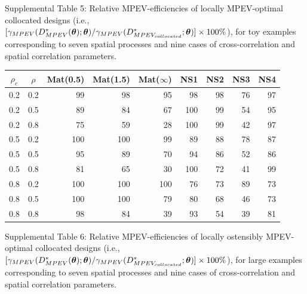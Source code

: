 \documentclass[12pt]{article}
\def\btheta{\mbox{\boldmath$\theta$}}
\begin{document}
Supplemental Table 5:  Relative MPEV-efficiencies of locally MPEV-optimal collocated designs (i.e., $ [\gamma_{MPEV}(D^{*}_{MPEV}(\btheta);\btheta)/\gamma_{MPEV}(D^{*}_{MPEV_{collocated}};\btheta) ]\times 100\%$), for toy examples corresponding to seven spatial processes and nine cases of cross-correlation and spatial correlation parameters.
{\footnotesize
\vspace{.05in}
\begin{center}
\begin{tabular}{|cc|rrrrrrr|}
\hline
$\rho_c$ & $\rho$ & Mat(0.5) & Mat(1.5) & Mat($\infty$) & NS1 & NS2 & NS3 & NS4\\
\hline
0.2 & 0.2 & 99  & 98  & 95  & 98  & 98 & 76 & 97\\
0.2 & 0.5 & 89  & 84  & 67  & 100 & 99 & 54 & 95\\
0.2 & 0.8 & 75  & 59  & 28  & 100 & 99 & 42 & 97\\
0.5 & 0.2 & 100 & 100 & 99  & 89  & 88 & 78 & 87\\
0.5 & 0.5 & 95  & 89  & 70  & 94  & 86 & 52 & 86\\
0.5 & 0.8 & 81  & 65  & 30  & 100 & 72 & 41 & 99\\
0.8 & 0.2 & 100 & 100 & 100 & 76  & 73 & 89 & 73\\
0.8 & 0.5 & 100 & 100 & 79  & 80  & 68 & 46 & 73\\
0.8 & 0.8 & 98  & 84  & 39  & 93  & 54 & 39 & 81\\
\hline
\end{tabular}
\end{center}}
\vspace{0.5in}
\noindent
Supplemental Table 6:  Relative MPEV-efficiencies of locally ostensibly MPEV-optimal collocated designs (i.e., $ [\gamma_{MPEV}(D^{*}_{MPEV}(\btheta);\btheta)/\gamma_{MPEV}(D^{*}_{MPEV_{collocated}};\btheta) ]\times 100\%$), for large examples corresponding to seven spatial processes and nine cases of cross-correlation and spatial correlation parameters.
\end{document}

